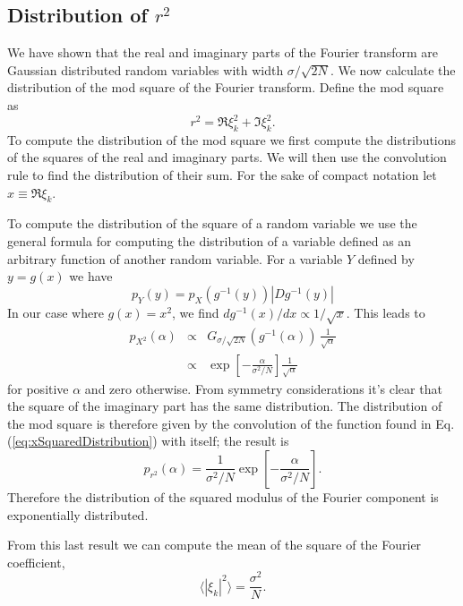 \subsection{Distribution of $r^2$}

We have shown that the real and imaginary parts of the Fourier transform are Gaussian distributed random variables with width $\sigma/\sqrt{2N}$.
We now calculate the distribution of the mod square of the Fourier transform.
Define the mod square as \begin{equation}
r^2 = \Re \xi_k ^2 + \Im \xi_k ^2 . \end{equation}
To compute the distribution of the mod square we first compute the distributions of the squares of the real and imaginary parts.
We will then use the convolution rule to find the distribution of their sum. For the sake of compact notation let $x \equiv \Re \xi _k$.

To compute the distribution of the square of a random variable we use the general formula for computing the distribution of a variable defined as an arbitrary function of another random variable. For a variable $Y$ defined by $y = g(x)$ we have \begin{equation}
p_Y(y) = p_X \left( g^{-1}(y) \right) \left| Dg^{-1}(y) \right| \end{equation}
In our case where $g(x) = x^2$, we find $dg^{-1}(x)/dx \propto 1/\sqrt{x}$.
This leads to \begin{eqnarray}
p_{X^2}(\alpha) &\propto& G_{\sigma / \sqrt{2N}}(g^{-1}(\alpha)) \, \frac{1}{\sqrt{\alpha}} \\
&\propto& \exp \left[ -\frac{\alpha}{\sigma^2 / N} \right] \frac{1}{\sqrt{\alpha}} \label{eq:xSquaredDistribution} \end{eqnarray}
for positive $\alpha$ and zero otherwise.
From symmetry considerations it's clear that the square of the imaginary part has the same distribution.
The distribution of the mod square is therefore given by the convolution of the function found in Eq. (\ref{eq:xSquaredDistribution}) with itself; the result is \begin{equation}
p_{r^2}(\alpha) = \frac{1}{\sigma^2/N} \exp\left[-\frac{\alpha}{\sigma^2/N}\right] . \end{equation}
Therefore the distribution of the squared modulus of the Fourier component is exponentially distributed.

From this last result we can compute the mean of the square of the Fourier coefficient,\begin{equation}
\langle |\xi_k|^2 \rangle = \frac{\sigma^2}{N} . \end{equation}

